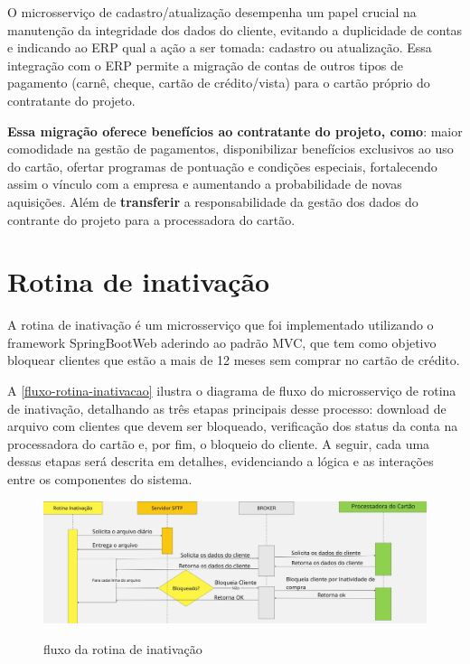 O microsserviço de cadastro/atualização desempenha um papel crucial na manutenção 
da integridade dos dados do cliente, evitando a duplicidade de contas e indicando 
ao ERP qual a ação a ser tomada: cadastro ou atualização. Essa integração com o ERP permite a migração  de contas de outros tipos de 
pagamento (carnê, cheque, cartão de crédito/vista) para o cartão próprio do 
contratante do projeto. 

\textbf{Essa migração oferece benefícios ao contratante 
do projeto, como}: maior comodidade na gestão de pagamentos, disponibilizar 
benefícios exclusivos ao uso do cartão, ofertar programas de pontuação e 
condições especiais, fortalecendo assim o vínculo com a empresa e aumentando a 
probabilidade de novas aquisições. Além de \textbf{transferir} a responsabilidade da gestão 
dos dados do contrante do projeto para a processadora do cartão.

\section{Rotina de inativação}

A rotina de inativação é um microsserviço que foi implementado utilizando o 
framework SpringBootWeb aderindo ao padrão MVC, que tem como objetivo bloquear 
clientes que estão a mais de 12 meses sem comprar no cartão de crédito.

A \autoref{fluxo-rotina-inativacao} ilustra o diagrama de fluxo do microsserviço 
de rotina de inativação, detalhando as três etapas principais desse processo: 
download de arquivo com clientes que devem ser bloqueado, verificação dos status 
da conta na processadora do cartão e, por fim, o bloqueio do cliente. A seguir, 
cada uma dessas etapas será descrita em detalhes, evidenciando a lógica e as 
interações entre os componentes do sistema. 

\begin{figure} [!h]
    \centering
    \caption{fluxo da rotina de inativação}
    \includegraphics[width=1\textwidth]{arquivos/imagens/fluxo-rotina-inativacao.jpg}
    \label{fluxo-rotina-inativacao}
\end{figure}

